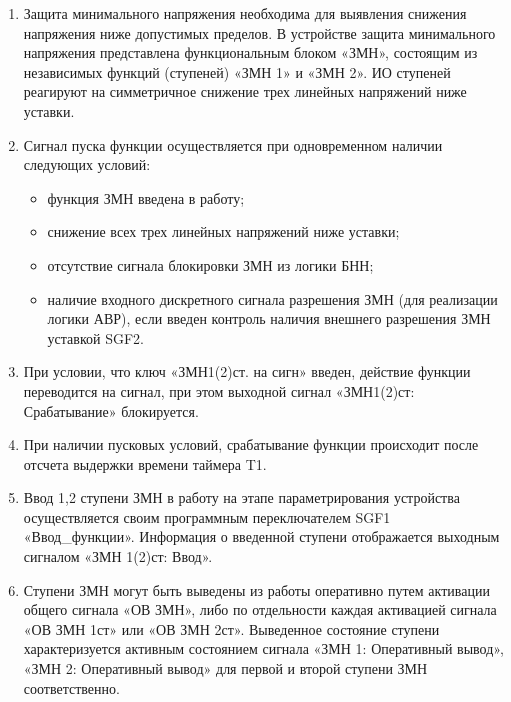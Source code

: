 
\color{black}

\begin{enumerate}

\item
Защита минимального напряжения необходима для выявления снижения напряжения ниже допустимых пределов. В устройстве защита минимального напряжения представлена функциональным блоком «ЗМН», состоящим из независимых функций (ступеней) «ЗМН 1» и «ЗМН 2». ИО ступеней реагируют на симметричное снижение трех линейных напряжений ниже уставки.

\item
Сигнал пуска функции осуществляется при одновременном наличии следующих условий:
\begin{itemize}
    \item функция ЗМН введена в работу;
    \item снижение всех трех линейных напряжений ниже уставки;
    \item отсутствие сигнала блокировки ЗМН из логики БНН;
    \item наличие входного дискретного сигнала разрешения ЗМН (для реализации логики АВР), если введен контроль наличия внешнего разрешения ЗМН уставкой SGF2.    
\end{itemize}

\item
При условии, что ключ «ЗМН1(2)ст. на сигн» введен, действие функции переводится на сигнал, при этом выходной сигнал «ЗМН1(2)ст: Срабатывание» блокируется.

\item
При наличии пусковых условий, срабатывание функции происходит после отсчета выдержки времени таймера T1.

\item
Ввод 1,2 ступени ЗМН в работу на этапе параметрирования устройства осуществляется своим программным переключателем SGF1 «Ввод\_функции». Информация о введенной ступени отображается выходным сигналом «ЗМН 1(2)ст: Ввод».

\item
Ступени ЗМН могут быть выведены из работы оперативно путем активации общего сигнала «ОВ ЗМН», либо по отдельности каждая активацией сигнала «ОВ ЗМН 1ст» или «ОВ ЗМН 2ст». Выведенное состояние ступени характеризуется активным состоянием сигнала «ЗМН 1: Оперативный вывод», «ЗМН 2: Оперативный вывод» для первой и второй ступени ЗМН соответственно.


\end{enumerate}
